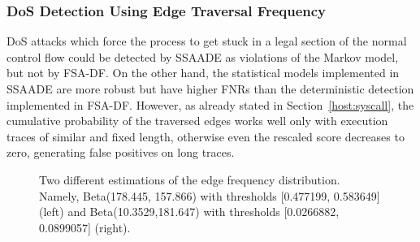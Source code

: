\subsubsection{DoS Detection Using Edge Traversal Frequency}
\label{host:improving:dos-detection-using}
\ac{DoS} attacks which force the process to get stuck in a legal section of the normal control flow could be detected by \ac{SSAADE} as violations of the Markov model, but not by FSA-DF. On the other hand, the statistical models implemented in \ac{SSAADE} are more robust but have higher \acp{FNR} than the deterministic detection implemented in FSA-DF. However, as already stated in Section~\ref{host:syscall}, the cumulative probability of the traversed edges works well only with execution traces of similar and fixed length, otherwise even the rescaled score decreases to zero, generating false positives on long traces.

\begin{figure}[t]
  \hspace*{-0.3cm}
  \caption{Two different estimations of the edge frequency distribution. Namely, Beta(178.445, 157.866) with thresholds [0.477199, 0.583649] (left) and Beta(10.3529,181.647) with thresholds [0.0266882, 0.0899057] (right).}
  \label{fig:execve beta}
\end{figure}

